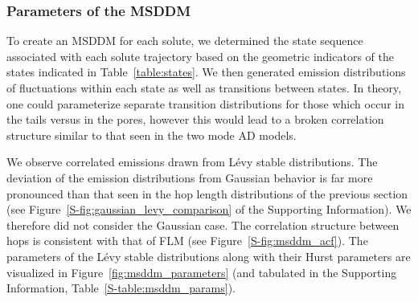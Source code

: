 \documentclass[journal=jctcce,manuscript=article]{achemso}
\begin{document}
  \subsubsection{Parameters of the MSDDM}\label{section:msddm_parameterization}

  To create an MSDDM for each solute, we determined the state sequence associated
  with each solute trajectory based on the geometric indicators of the states 
  indicated in Table~\ref{table:states}. We then generated emission distributions of fluctuations
  within each state as well as transitions between states. In theory, one could 
  parameterize separate transition distributions for those which occur in the tails 
  versus in the pores, however this would lead to a broken correlation structure 
  similar to that seen in the two mode AD models.

  We observe correlated emissions drawn from L\'evy stable distributions. The
  deviation of the emission distributions from Gaussian behavior is far more
  pronounced than that seen in the hop length distributions of the previous
  section (see Figure~\ref{S-fig:gaussian_levy_comparison} of the Supporting
  Information). We therefore did not consider the Gaussian case. The correlation
  structure between hops is consistent with that of FLM (see 
  Figure~\ref{S-fig:msddm_acf}). The parameters of the L\'evy stable distributions
  along with their Hurst parameters are visualized in Figure~\ref{fig:msddm_parameters}
  (and tabulated in the Supporting Information, Table~\ref{S-table:msddm_params}). 
  
\end{document}
